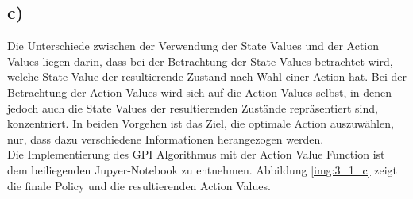 \documentclass[11pt]{article}
\begin{document}
\subsection*{c)}
Die Unterschiede zwischen der Verwendung der State Values und der Action Values liegen darin, dass bei der Betrachtung der State Values betrachtet wird, welche State Value der resultierende Zustand nach Wahl einer Action hat. Bei der Betrachtung der Action Values wird sich auf die Action Values selbst, in denen jedoch auch die State Values der resultierenden Zustände repräsentiert sind, konzentriert. In beiden Vorgehen ist das Ziel, die optimale Action auszuwählen, nur, dass dazu verschiedene Informationen herangezogen werden.\\
Die Implementierung des GPI Algorithmus mit der Action Value Function ist dem beiliegenden Jupyer-Notebook zu entnehmen. Abbildung \ref{img:3_1_c} zeigt die finale Policy und die resultierenden Action Values.\\
\end{document}
